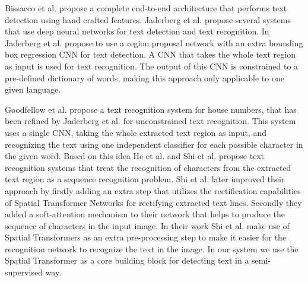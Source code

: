 \documentclass[letterpaper]{article}
\begin{document}
	Bissacco et al. \cite{Bissacco2013Photoocr} propose a complete end-to-end architecture that performs text detection using hand crafted features.
	Jaderberg et al. \cite{Jaderberg2015Reading,Jaderberg2014Deep} propose several systems that use deep neural networks for text detection and text recognition.
	In \cite{Jaderberg2015Reading} Jaderberg et al. propose to use a region proposal network with an extra bounding box regression CNN for text detection.
	A CNN that takes the whole text region as input is used for text recognition.
	The output of this CNN is constrained to a pre-defined dictionary of words, making this approach only applicable to one given language.

	Goodfellow et al. \cite{Goodfellow2014MultiDigit} propose a text recognition system for house numbers, that has been refined by Jaderberg et al. \cite{Jaderberg2014Deep} for unconstrained text recognition.
	This system uses a single \ac{CNN}, taking the whole extracted text region as input, and recognizing the text using one independent classifier for each possible character in the given word.
	Based on this idea He et al. \cite{He2016Reading} and Shi et al. \cite{Shi2016EndToEnd} propose text recognition systems that treat the recognition of characters from the extracted text region as a sequence recognition problem.
	Shi et al. \cite{Shi2016Robust} later improved their approach by firstly adding an extra step that utilizes the rectification capabilities of Spatial Transformer Networks \cite{Jaderberg2015Spatial} for rectifying extracted text lines.
	Secondly they added a soft-attention mechanism to their network that helps to produce the sequence of characters in the input image.
	In their work Shi et al. make use of Spatial Transformers as an extra pre-processing step to make it easier for the recognition network to recognize the text in the image. In our system we use the Spatial Transformer as a core building block for detecting text in a semi-supervised way.
\end{document}
